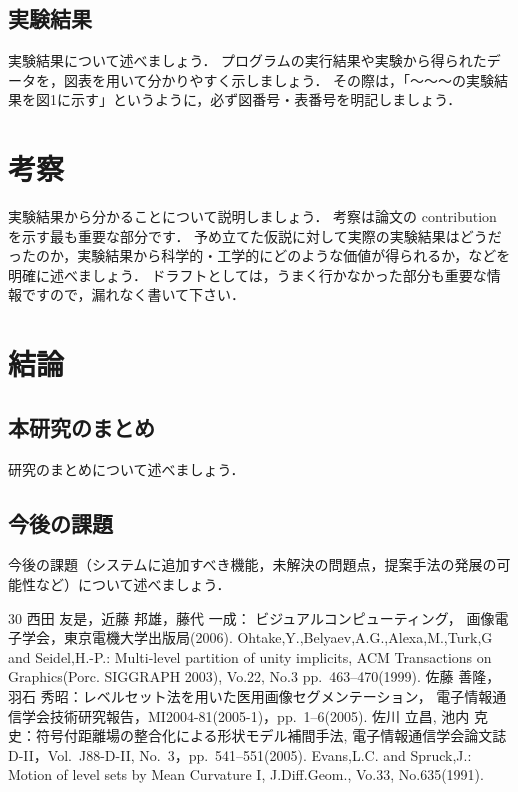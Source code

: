 \documentclass[uplatex,draft]{ipsjpapers}
\begin{document}
\subsection{実験結果}
実験結果について述べましょう．
プログラムの実行結果や実験から得られたデータを，図表を用いて分かりやすく示しましょう．
その際は，「～～～の実験結果を図1に示す」というように，必ず図番号・表番号を明記しましょう．
%
\section{考察}
\label{sec:discussion}
実験結果から分かることについて説明しましょう．
考察は論文の contribution を示す最も重要な部分です．
予め立てた仮説に対して実際の実験結果はどうだったのか，実験結果から科学的・工学的にどのような価値が得られるか，などを明確に述べましょう．
ドラフトとしては，うまく行かなかった部分も重要な情報ですので，漏れなく書いて下さい．
%
%
\section{結論}
\label{sec:conclusion}
\subsection{本研究のまとめ}
研究のまとめについて述べましょう．
%
\subsection{今後の課題}
今後の課題（システムに追加すべき機能，未解決の問題点，提案手法の発展の可能性など）について述べましょう．
%
%
\begin{thebibliography} {30}
  西田 友是，近藤 邦雄，藤代 一成：
  ビジュアルコンピューティング，
  画像電子学会，東京電機大学出版局(2006).
  Ohtake,Y.,Belyaev,A.G.,Alexa,M.,Turk,G and Seidel,H.-P.:
  Multi-level partition of unity implicits,
  ACM Transactions on Graphics(Porc. SIGGRAPH 2003),
  Vo.22, No.3 pp.\ 463--470(1999).
  佐藤 善隆，羽石 秀昭：レベルセット法を用いた医用画像セグメンテーション，
  電子情報通信学会技術研究報告，MI2004-81(2005-1)，pp.\ 1--6(2005).
  佐川 立昌, 池内 克史：符号付距離場の整合化による形状モデル補間手法,
  電子情報通信学会論文誌 D-II，Vol.~J88-D-II, No.~3，pp.\ 541--551(2005).
  Evans,L.C. and Spruck,J.:
  Motion of level sets by Mean Curvature I,
  J.Diff.Geom., Vo.33, No.635(1991).
\end{thebibliography}
%
%
%
%
%
%
\appendix
\end{document}
